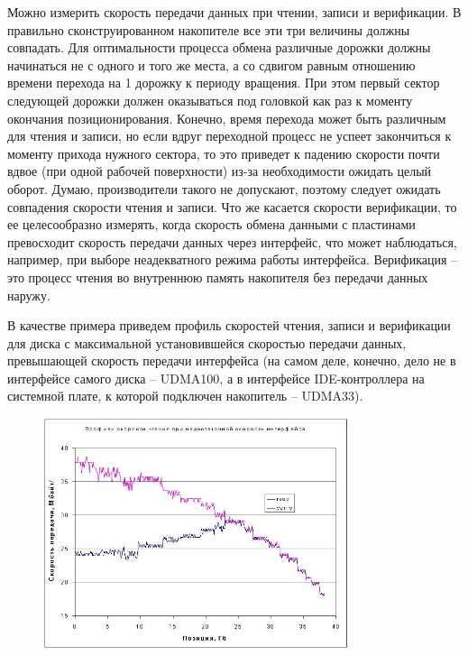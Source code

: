 \documentclass[bachelor, och, referat]{SCWorks}
\begin{document}
Можно измерить скорость передачи данных при чтении, записи и верификации. В правильно сконструированном накопителе все эти три величины должны совпадать. Для оптимальности процесса обмена различные дорожки должны начинаться не с одного и того же места, а со сдвигом равным отношению времени перехода на 1 дорожку к периоду вращения. При этом первый сектор следующей дорожки должен оказываться под головкой как раз к моменту окончания позиционирования. Конечно, время перехода может быть различным для чтения и записи, но если вдруг переходной процесс не успеет закончиться к моменту прихода нужного сектора, то это приведет к падению скорости почти вдвое (при одной рабочей поверхности) из-за необходимости ожидать целый оборот. Думаю, производители такого не допускают, поэтому следует ожидать совпадения скорости чтения и записи. Что же касается скорости верификации, то ее целесообразно измерять, когда скорость обмена данными с пластинами превосходит скорость передачи данных через интерфейс, что может наблюдаться, например, при выборе неадекватного режима работы интерфейса. Верификация -- это процесс чтения во внутреннюю память накопителя без передачи данных наружу.

В качестве примера приведем профиль скоростей чтения, записи и верификации для диска с максимальной установившейся скоростью передачи данных, превышающей скорость передачи интерфейса (на самом деле, конечно, дело не в интерфейсе самого диска -- UDMA100, а в интерфейсе IDE-контроллера на системной плате, к которой подключен накопитель -- UDMA33).

\begin{figure}[H]
    \centering
    \includegraphics[width=0.8\textwidth]{graph2.png}
    \caption{}
    \label{}
\end{figure}
\end{document}
